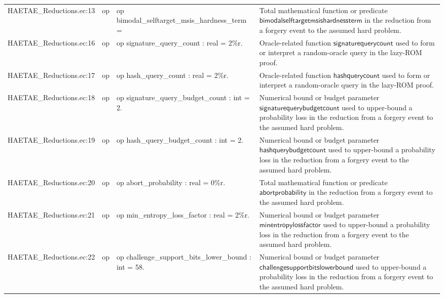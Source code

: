 \documentclass[10pt]{article}
\begin{document}
\begin{longtable}{L{0.11\textwidth}L{0.055\textwidth}L{0.385\textwidth}L{0.41\textwidth}}
HAETAE\_\allowbreak{}Reductions.\allowbreak{}ec:\allowbreak{}13 & op & {\ttfamily\scriptsize op bimodal\_\allowbreak{}selftarget\_\allowbreak{}msis\_\allowbreak{}hardness\_\allowbreak{}term =} & Total mathematical function or predicate $\mathsf{bimodalselftargetmsishardnessterm}$ in the reduction from a forgery event to the assumed hard problem. \\
HAETAE\_\allowbreak{}Reductions.\allowbreak{}ec:\allowbreak{}16 & op & {\ttfamily\scriptsize op signature\_\allowbreak{}query\_\allowbreak{}count : real = 2\%r.} & Oracle-related function $\mathsf{signaturequerycount}$ used to form or interpret a random-oracle query in the lazy-ROM proof. \\
HAETAE\_\allowbreak{}Reductions.\allowbreak{}ec:\allowbreak{}17 & op & {\ttfamily\scriptsize op hash\_\allowbreak{}query\_\allowbreak{}count : real = 2\%r.} & Oracle-related function $\mathsf{hashquerycount}$ used to form or interpret a random-oracle query in the lazy-ROM proof. \\
HAETAE\_\allowbreak{}Reductions.\allowbreak{}ec:\allowbreak{}18 & op & {\ttfamily\scriptsize op signature\_\allowbreak{}query\_\allowbreak{}budget\_\allowbreak{}count : int = 2.} & Numerical bound or budget parameter $\mathsf{signaturequerybudgetcount}$ used to upper-bound a probability loss in the reduction from a forgery event to the assumed hard problem. \\
HAETAE\_\allowbreak{}Reductions.\allowbreak{}ec:\allowbreak{}19 & op & {\ttfamily\scriptsize op hash\_\allowbreak{}query\_\allowbreak{}budget\_\allowbreak{}count : int = 2.} & Numerical bound or budget parameter $\mathsf{hashquerybudgetcount}$ used to upper-bound a probability loss in the reduction from a forgery event to the assumed hard problem. \\
HAETAE\_\allowbreak{}Reductions.\allowbreak{}ec:\allowbreak{}20 & op & {\ttfamily\scriptsize op abort\_\allowbreak{}probability : real = 0\%r.} & Total mathematical function or predicate $\mathsf{abortprobability}$ in the reduction from a forgery event to the assumed hard problem. \\
HAETAE\_\allowbreak{}Reductions.\allowbreak{}ec:\allowbreak{}21 & op & {\ttfamily\scriptsize op min\_\allowbreak{}entropy\_\allowbreak{}loss\_\allowbreak{}factor : real = 2\%r.} & Numerical bound or budget parameter $\mathsf{minentropylossfactor}$ used to upper-bound a probability loss in the reduction from a forgery event to the assumed hard problem. \\
HAETAE\_\allowbreak{}Reductions.\allowbreak{}ec:\allowbreak{}22 & op & {\ttfamily\scriptsize op challenge\_\allowbreak{}support\_\allowbreak{}bits\_\allowbreak{}lower\_\allowbreak{}bound : int = 58.} & Numerical bound or budget parameter $\mathsf{challengesupportbitslowerbound}$ used to upper-bound a probability loss in the reduction from a forgery event to the assumed hard problem. \\

\end{longtable}
\end{document}
